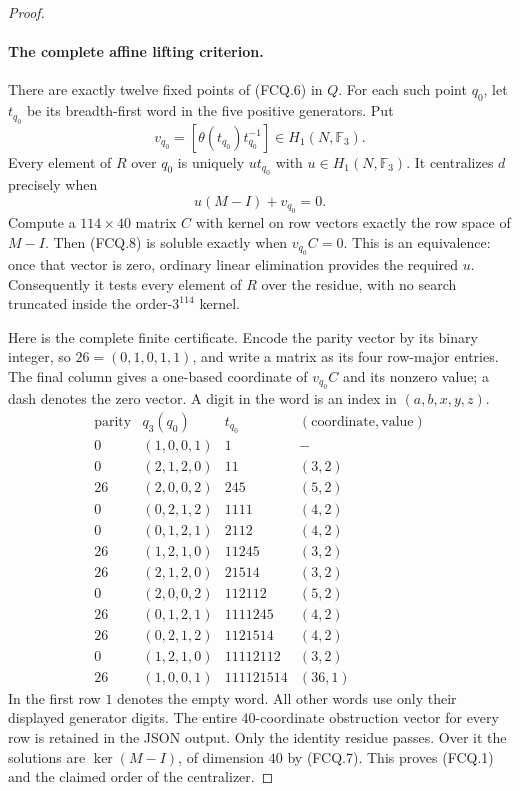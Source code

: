 \begin{proof}
\paragraph{The complete affine lifting criterion.}
There are exactly twelve fixed points of \textup{(FCQ.6)} in $Q$.
For each such point $q_0$, let $t_{q_0}$ be its breadth-first word
in the five positive generators.  Put
\[
 v_{q_0}=[\theta(t_{q_0})t_{q_0}^{-1}]
       \in H_1(N,\mathbb F_3).
\]
Every element of $R$ over $q_0$ is uniquely $u t_{q_0}$ with
$u\in H_1(N,\mathbb F_3)$.  It centralizes $d$ precisely when
\[
                 u(M-I)+v_{q_0}=0.                \tag{FCQ.8}
\]
Compute a $114\times40$ matrix $C$ with kernel on row vectors
exactly the row space of $M-I$.  Then \textup{(FCQ.8)} is soluble
exactly when $v_{q_0}C=0$.  This is an equivalence: once that vector
is zero, ordinary linear elimination provides the required $u$.
Consequently it tests every element of $R$ over the residue, with
no search truncated inside the order-$3^{114}$ kernel.

Here is the complete finite certificate.  Encode the parity vector
by its binary integer, so $26=(0,1,0,1,1)$, and write a matrix as
its four row-major entries.  The final column gives a one-based
coordinate of $v_{q_0}C$ and its nonzero value; a dash denotes the
zero vector.  A digit in the word is an index in $(a,b,x,y,z)$.
\[
\begin{array}{r|c|l|c}
 \text{parity}&q_3(q_0)&t_{q_0}&
     (\text{coordinate},\text{value})\\\hline
0 &(1,0,0,1)&1&-\\
0 &(2,1,2,0)&11&(3,2)\\
26&(2,0,0,2)&245&(5,2)\\
0 &(0,2,1,2)&1111&(4,2)\\
0 &(0,1,2,1)&2112&(4,2)\\
26&(1,2,1,0)&11245&(3,2)\\
26&(2,1,2,0)&21514&(3,2)\\
0 &(2,0,0,2)&112112&(5,2)\\
26&(0,1,2,1)&1111245&(4,2)\\
26&(0,2,1,2)&1121514&(4,2)\\
0 &(1,2,1,0)&11112112&(3,2)\\
26&(1,0,0,1)&111121514&(36,1)
\end{array}                                                     \tag{FCQ.9}
\]
In the first row $1$ denotes the empty word.  All other words use
only their displayed generator digits.  The entire $40$-coordinate
obstruction vector for every row is retained in the JSON output.
Only the identity residue passes.  Over it the solutions are
$\ker(M-I)$, of dimension $40$ by \textup{(FCQ.7)}.  This proves
\textup{(FCQ.1)} and the claimed order of the centralizer.


\end{proof}
